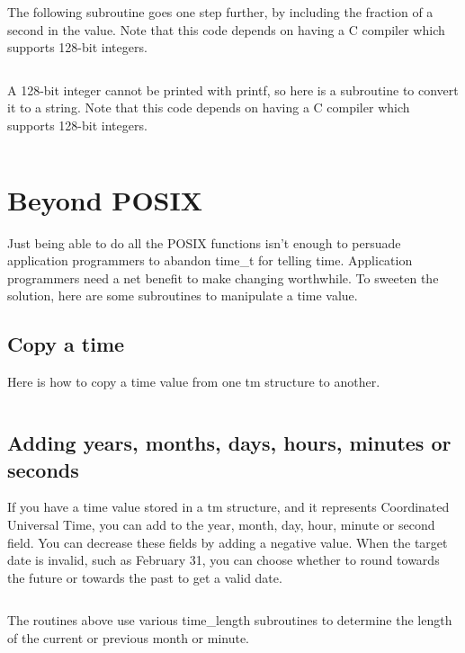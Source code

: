 \documentclass[letterpaper,twoside]{article}
\begin{document}
The following subroutine goes one step further, by including the
fraction of a second in the value.  Note that this code depends
on having a C compiler which supports 128-bit integers.
\inputminted[firstline=32]{c}{src/time_tm_nano_to_integer.c}

A 128-bit integer cannot be printed with printf, so here is a subroutine
to convert it to a string.  Note that this code depends on having
a C compiler which supports 128-bit integers.
\inputminted[firstline=32]{c}{src/int128_to_string.c}

\section{Beyond POSIX}
Just being able to do all the POSIX functions isn't enough to persuade
application programmers to abandon {\ttfamily time\_t} for telling time.
Application programmers
need a net benefit to make changing worthwhile.  To sweeten the solution,
here are some subroutines to manipulate a time value.

\subsection{Copy a time}
\label{subsection:copy}
Here is how to copy a time value from one {\ttfamily tm} structure to another.
\inputminted[firstline=34]{c}{src/time_copy.c}

\subsection{Adding years, months, days, hours, minutes or seconds}
\label{subsection:timeUTCadd}
If you have a time value stored in a {\ttfamily tm} structure, and it represents
Coordinated Universal Time, you can add to the year, month, day, hour,
minute or second field.  You can decrease these fields by adding a
negative value.  When the target date is invalid, such as February 31,
you can choose whether to round towards the future or towards the past
to get a valid date.
\inputminted[firstline=32]{c}{src/time_utc_add.c}
The routines above use various time\_length subroutines to determine
the length of the current or previous month or minute.
\inputminted[firstline=32]{c}{src/time_length.c}
\end{document}
